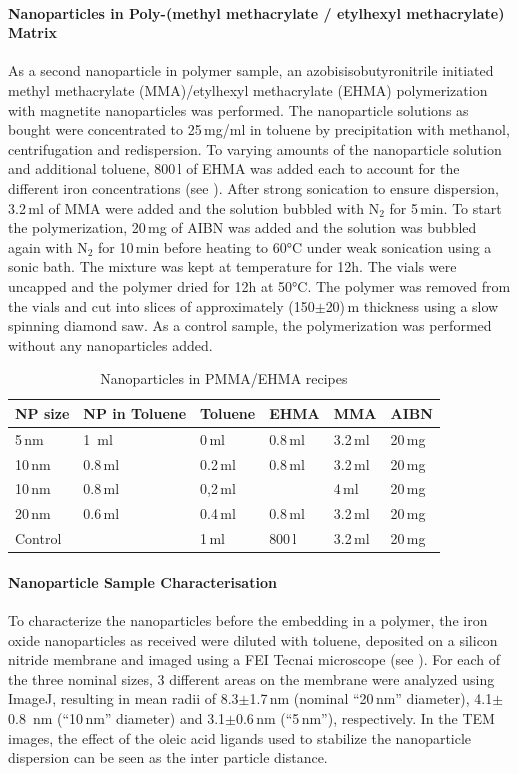 \paragraph{Nanoparticles in Poly-(methyl methacrylate / etylhexyl methacrylate)  Matrix}
As a second nanoparticle in polymer sample, an azobisisobutyronitrile initiated methyl methacrylate (MMA)/etylhexyl methacrylate (EHMA) polymerization with magnetite nanoparticles was performed. 
The nanoparticle solutions as bought were concentrated to 25\,mg/ml in toluene by precipitation with methanol, centrifugation and redispersion.  To varying amounts of the nanoparticle solution and additional toluene, 800\,\textmu l of EHMA was added each to account for the different iron concentrations (see ). After strong sonication to ensure dispersion, 3.2\,ml of MMA were added and the solution  bubbled with N$_2$ for 5\,min. To start the polymerization, 20\,mg of AIBN was added and the solution was bubbled again with N$_2$  for 10\,min before heating to 60°C under weak sonication using a sonic bath. The mixture was kept at temperature for 12h.
The vials were uncapped and the polymer dried for 12h at 50°C. The polymer was removed from the vials and cut into slices of approximately (150$\pm$20)\,\textmu m thickness using a slow spinning diamond saw.
As a control sample, the polymerization was performed without any nanoparticles added.

\begin{table}
	\centering
	\caption{Nanoparticles in PMMA/EHMA recipes}
	\label{tab:sampleCP}
	\begin{tabular}{llllll}
		\hline
		NP size &NP in Toluene&Toluene & EHMA & MMA & AIBN \\
		\hline
		5\,nm&1 \,ml & 0\,ml&0.8\,ml&  3.2\,ml&   20\,mg    \\
		10\,nm& 0.8\,ml& 0.2\,ml & 0.8\,ml&  3.2\,ml&   20\,mg    \\
		10\,nm& 0.8\,ml& 0,2\,ml &            &  4\,ml   &   20\,mg    \\
		20\,nm& 0.6\,ml& 0.4\,ml& 0.8\,ml&  3.2\,ml&   20\,mg    \\
		Control&           & 1\,ml     &800\,\textmu l&  3.2\,ml&   20\,mg    \\
		\hline
	\end{tabular}
\end{table}

\paragraph{Nanoparticle Sample Characterisation}
To characterize the nanoparticles before the embedding in a polymer, the iron oxide nanoparticles as received were diluted with toluene, deposited on a silicon nitride membrane and imaged using a FEI Tecnai microscope  (see ).  For each of the three nominal sizes, 3 different areas on the membrane were analyzed using ImageJ, resulting in mean radii of 8.3$\pm$1.7\,nm (nominal \enquote{20\,nm} diameter), 4.1$\pm$0.8 \,nm	(\enquote{10\,nm} diameter) and 3.1$\pm$0.6\,nm (\enquote{5\,nm}), respectively. In the TEM images, the effect of the oleic acid ligands used to stabilize the nanoparticle dispersion can be seen as the inter particle distance.

